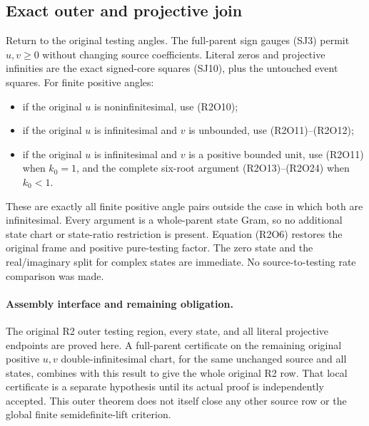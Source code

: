 \subsection{Exact outer and projective join}

Return to the original testing angles.  The full-parent sign gauges
(SJ3) permit $u,v\geq0$ without changing source coefficients.  Literal
zeros and projective infinities are the exact signed-core squares
(SJ10), plus the untouched event squares.  For finite positive angles:
\begin{itemize}
\item if the original $u$ is noninfinitesimal, use (R2O10);
\item if the original $u$ is infinitesimal and $v$ is unbounded,
      use (R2O11)--(R2O12);
\item if the original $u$ is infinitesimal and $v$ is a positive
      bounded unit, use (R2O11) when $k_0=1$, and the complete
      six-root argument (R2O13)--(R2O24) when $k_0<1$.
\end{itemize}
These are exactly all finite positive angle pairs outside the case in
which both are infinitesimal.  Every argument is a whole-parent state
Gram, so no additional state chart or state-ratio restriction is present.
Equation (R2O6) restores the original frame and positive pure-testing
factor.  The zero state and the real/imaginary split for complex states
are immediate.  No source-to-testing rate comparison was made.

\paragraph{Assembly interface and remaining obligation.}
The original R2 outer testing region, every state, and all literal
projective endpoints are proved here.  A full-parent certificate on the
remaining original positive $u,v$ double-infinitesimal chart, for the
same unchanged source and all states, combines with this result to give
the whole original R2 row.  That local certificate is a separate
hypothesis until its actual proof is independently accepted.  This
outer theorem does not itself close any other source row or the global
finite semidefinite-lift criterion.

